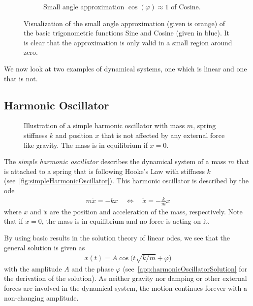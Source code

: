 \begin{figure}
\begin{subfigure}[t]{0.5\linewidth}
				\caption{Small angle approximation \( \cos(\varphi) \approx 1 \) of Cosine.}
			\end{subfigure}
			\caption{Visualization of the small angle approximation (given is orange) of the basic trigonometric functions Sine and Cosine (given in blue). It is clear that the approximation is only valid in a small region around zero.}
			\label{fig:smallAngleApproximation}
		\end{figure}
	
		We now look at two examples of dynamical systems, one which is linear and one that is not.
		
		\subsection{Harmonic Oscillator}
			\label{subsec:harmonicOscillator}
		
			\begin{figure}
				\centering
				\tikzHarmonicOscillator
				\caption{Illustration of a simple harmonic oscillator with mass \(m\), spring stiffness \(k\) and position \(x\) that is not affected by any external force like gravity. The mass is in equilibrium if \( x = 0 \).}
				\label{fig:simpleHarmonicOscillator}
			\end{figure}
	
			The \emph{simple harmonic oscillator} describes the dynamical system of a mass \(m\) that is attached to a spring that is following Hooke's Law with stiffness \(k\) (see~\autoref{fig:simpleHarmonicOscillator}). This harmonic oscillator is described by the \ac{ode}
			\begin{align*}
				m\ddot{x} = -kx \quad\iff\quad \ddot{x} = -\frac{k}{m} x
			\end{align*}
			where \(x\) and \(\ddot{x}\) are the position and acceleration of the mass, respectively. Note that if \( x = 0 \), the mass is in equilibrium and no force is acting on it.
			
			By using basic results in the solution theory of linear \acp{ode}, we see that the general solution is given as
			\begin{align*}
				x(t) = A \cos\Big(t \sqrt{k / m} + \varphi\Big)
			\end{align*}
			with the amplitude \(A\) and the phase \(\varphi\) (see~\autoref{app:harmonicOscillatorSolution} for the derivation of the solution). As neither gravity nor damping or other external forces are involved in the dynamical system, the motion continues forever with a non-changing amplitude.
		
